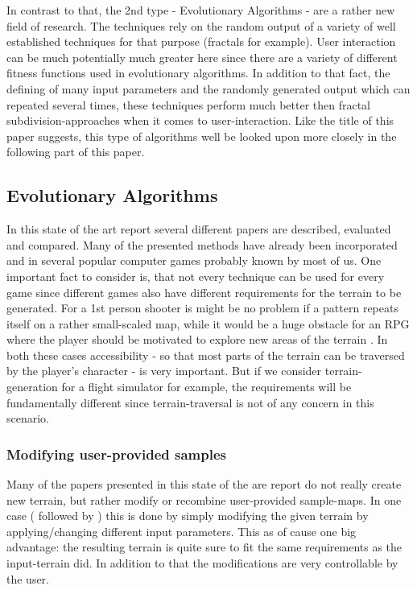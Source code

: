 In contrast to that, the 2nd type - Evolutionary Algorithms - are a rather new field of research. The techniques rely on the random output of a variety of well established techniques for that purpose (fractals for example). User interaction can be much potentially much greater here since there are a variety of different fitness functions used in evolutionary algorithms. In addition to that fact, the defining of many input parameters and the randomly generated output which can repeated several times, these techniques perform much better then fractal subdivision-approaches when it comes to user-interaction. Like the title of this paper suggests, this type of algorithms well be looked upon more closely in the following part of this paper.

\subsection{Evolutionary Algorithms}
In this state of the art report several different papers are described, evaluated and compared. Many of the presented methods have already been incorporated and in several popular computer games probably known by most of us. One important fact to consider is, that not every technique can be used for every game since different games also have different requirements for the terrain to be generated. For a 1st person shooter is might be no problem if a pattern repeats itself on a rather small-scaled map, while it would be a huge obstacle for an RPG where the player should be motivated to explore new areas of the terrain \cite{raffe2012survey}. In both these cases accessibility - so that most parts of the terrain can be traversed by the player's character - is very important. But if we consider terrain-generation for a flight simulator for example, the requirements will be fundamentally different since terrain-traversal is not of any concern in this scenario.

\subsubsection{Modifying user-provided samples}
Many of the papers presented in this state of the are report do not really create new terrain, but rather modify or recombine user-provided sample-maps. In one case (\cite{walsh2010terrain} followed by \cite{walsh2011use}) this is done by simply modifying the given terrain by applying/changing different input parameters. This as of cause one big advantage: the resulting terrain is quite sure to fit the same requirements as the input-terrain did. In addition to that the modifications are very controllable by the user.


